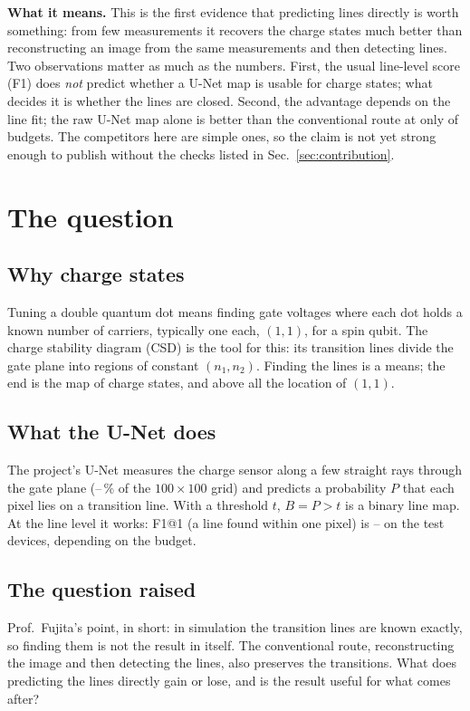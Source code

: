 \documentclass[10pt,a4paper]{article}
\begin{document}
\textbf{What it means.}  This is the first evidence that predicting lines
directly is worth something: from few measurements it recovers the charge
states much better than reconstructing an image from the same measurements
and then detecting lines.  Two observations matter as much as the numbers.
First, the usual line-level score (F1) does \emph{not} predict whether a
U-Net map is usable for charge states; what decides it is whether the lines
are closed.  Second, the advantage depends on the line fit; the raw U-Net
map alone is better than the conventional route at only \vEqRawWins{} of
\vEqNBud{} budgets.  The competitors here are simple ones, so the claim is
not yet strong enough to publish without the checks listed in
Sec.~\ref{sec:contribution}.

\section{The question}

\subsection{Why charge states}
Tuning a double quantum dot means finding gate voltages where each dot
holds a known number of carriers, typically one each, $(1,1)$, for a
spin qubit.  The charge stability diagram (CSD) is the tool for this: its
transition lines divide the gate plane into regions of constant
$(n_1,n_2)$.  Finding the lines is a means; the end is the map of charge
states, and above all the location of $(1,1)$.

\subsection{What the U-Net does}
The project's U-Net measures the charge sensor along a few straight rays
through the gate plane (\vCovLo--\vCovHi\,\% of the $100\times100$ grid) and
predicts a probability $P$ that each pixel lies on a transition line.  With
a threshold $t$, $B=P>t$ is a binary line map.  At the line level it works:
F1@1 (a line found within one pixel) is \vLineFoneMin--\vLineFoneMax{} on the
test devices, depending on the budget.

\subsection{The question raised}
Prof.\ Fujita's point, in short: in simulation the transition lines are
known exactly, so finding them is not the result in itself.  The
conventional route, reconstructing the image and then detecting the lines,
also preserves the transitions.  What does predicting the lines directly
gain or lose, and is the result useful for what comes after?
\end{document}
